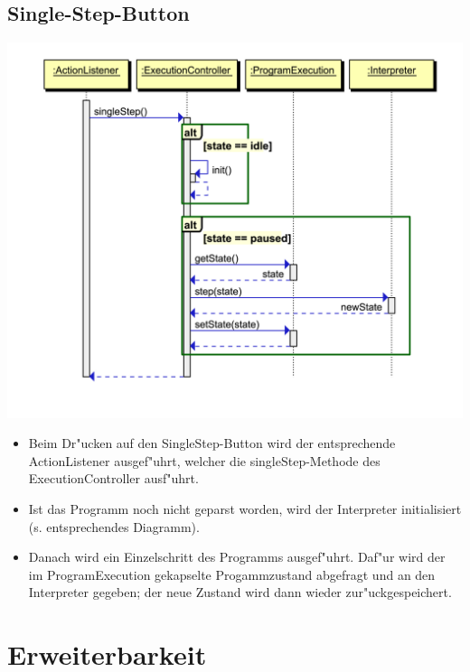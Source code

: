 \documentclass[10pt,a4paper,titlepage]{article}
\begin{document}
\subsection{Single-Step-Button}
\includegraphics[scale=0.9]{images/Button_Singlestep.pdf} \newline
\begin{itemize}
\item Beim Dr"ucken auf den SingleStep-Button wird der entsprechende ActionListener ausgef"uhrt, welcher die singleStep-Methode des ExecutionController ausf"uhrt.
\item Ist das Programm noch nicht geparst worden, wird der Interpreter initialisiert (s. entsprechendes Diagramm).
\item Danach wird ein Einzelschritt des Programms ausgef"uhrt. Daf"ur wird der im ProgramExecution gekapselte Progammzustand abgefragt und an den Interpreter gegeben; der neue Zustand wird dann wieder zur"uckgespeichert.
\end{itemize}

\newpage
\section{Erweiterbarkeit}

\end{document}
